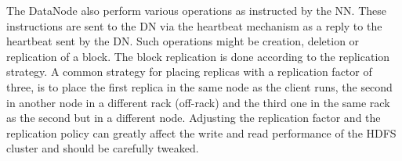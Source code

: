 The DataNode also perform various operations as instructed by the
NN. These instructions are sent to the DN via the heartbeat
mechanism as a reply to the heartbeat sent by the DN. Such operations
might be creation, deletion or replication of a block. The block
replication is done according to the replication strategy. A common
strategy for placing replicas with a replication factor of three, is
to place the first replica in the same node as the client runs, the
second in another node in a different rack (off-rack) and the third
one in the same rack as the second but in a different node. Adjusting
the replication factor and the replication policy can greatly affect
the write and read performance of the HDFS cluster and should be
carefully tweaked.
